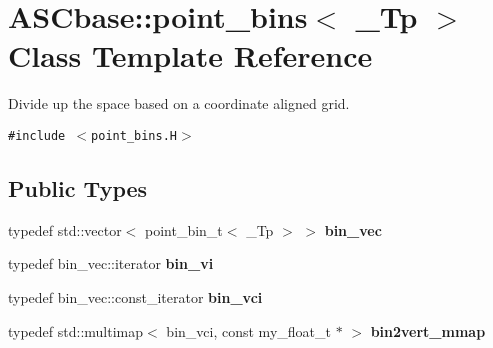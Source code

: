 \section{ASCbase::point\_\-bins$<$ \_\-Tp $>$ Class Template Reference}
\label{classASCbase_1_1point__bins}
Divide up the space based on a coordinate aligned grid.  


{\tt \#include $<$point\_\-bins.H$>$}

\subsection*{Public Types}
\begin{CompactItemize}
\item 
typedef std::vector$<$ point\_\-bin\_\-t$<$ \_\-Tp $>$ $>$ \textbf{bin\_\-vec}\label{classASCbase_1_1point__bins_dfb6ebb20eb7f4497553a21504367efa}

\item 
typedef bin\_\-vec::iterator \textbf{bin\_\-vi}\label{classASCbase_1_1point__bins_2612ddc643a2f477309393a2c8ded71c}

\item 
typedef bin\_\-vec::const\_\-iterator \textbf{bin\_\-vci}\label{classASCbase_1_1point__bins_32892df5e6abb8c0d4241ef6ed439604}

\item 
typedef std::multimap$<$ bin\_\-vci, const my\_\-float\_\-t $\ast$ $>$ \textbf{bin2vert\_\-mmap}\label{classASCbase_1_1point__bins_39a6b59e9bbd2dea53aa1715e9729edf}

\end{CompactItemize}
